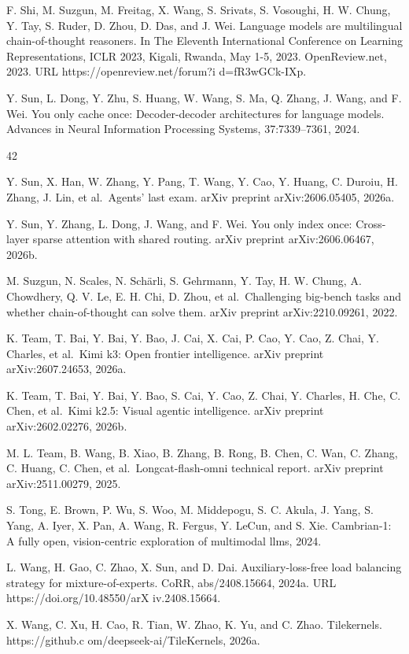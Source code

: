 \documentclass[
  10
]{article}
\begin{document}
F. Shi, M. Suzgun, M. Freitag, X. Wang, S. Srivats, S. Vosoughi, H. W.
Chung, Y. Tay, S. Ruder, D. Zhou, D. Das, and J. Wei. Language models
are multilingual chain-of-thought reasoners. In The Eleventh
International Conference on Learning Representations, ICLR 2023, Kigali,
Rwanda, May 1-5, 2023. OpenReview.net, 2023. URL
https://openreview.net/forum?i d=fR3wGCk-IXp.

Y. Sun, L. Dong, Y. Zhu, S. Huang, W. Wang, S. Ma, Q. Zhang, J. Wang,
and F. Wei. You only cache once: Decoder-decoder architectures for
language models. Advances in Neural Information Processing Systems,
37:7339--7361, 2024.

42

Y. Sun, X. Han, W. Zhang, Y. Pang, T. Wang, Y. Cao, Y. Huang, C. Duroiu,
H. Zhang, J. Lin, et al.~Agents' last exam. arXiv preprint
arXiv:2606.05405, 2026a.

Y. Sun, Y. Zhang, L. Dong, J. Wang, and F. Wei. You only index once:
Cross-layer sparse attention with shared routing. arXiv preprint
arXiv:2606.06467, 2026b.

M. Suzgun, N. Scales, N. Schärli, S. Gehrmann, Y. Tay, H. W. Chung, A.
Chowdhery, Q. V. Le, E. H. Chi, D. Zhou, et al.~Challenging big-bench
tasks and whether chain-of-thought can solve them. arXiv preprint
arXiv:2210.09261, 2022.

K. Team, T. Bai, Y. Bai, Y. Bao, J. Cai, X. Cai, P. Cao, Y. Cao, Z.
Chai, Y. Charles, et al.~Kimi k3: Open frontier intelligence. arXiv
preprint arXiv:2607.24653, 2026a.

K. Team, T. Bai, Y. Bai, Y. Bao, S. Cai, Y. Cao, Z. Chai, Y. Charles, H.
Che, C. Chen, et al.~Kimi k2.5: Visual agentic intelligence. arXiv
preprint arXiv:2602.02276, 2026b.

M. L. Team, B. Wang, B. Xiao, B. Zhang, B. Rong, B. Chen, C. Wan, C.
Zhang, C. Huang, C. Chen, et al.~Longcat-flash-omni technical report.
arXiv preprint arXiv:2511.00279, 2025.

S. Tong, E. Brown, P. Wu, S. Woo, M. Middepogu, S. C. Akula, J. Yang, S.
Yang, A. Iyer, X. Pan, A. Wang, R. Fergus, Y. LeCun, and S. Xie.
Cambrian-1: A fully open, vision-centric exploration of multimodal llms,
2024.

L. Wang, H. Gao, C. Zhao, X. Sun, and D. Dai. Auxiliary-loss-free load
balancing strategy for mixture-of-experts. CoRR, abs/2408.15664, 2024a.
URL https://doi.org/10.48550/arX iv.2408.15664.

X. Wang, C. Xu, H. Cao, R. Tian, W. Zhao, K. Yu, and C. Zhao.
Tilekernels. https://github.c om/deepseek-ai/TileKernels, 2026a.
\end{document}
